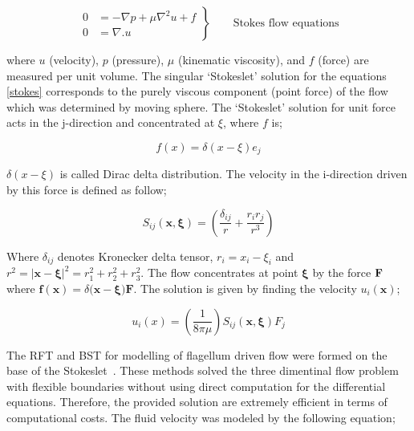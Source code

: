 \documentclass[12pt,a4paper,titlepage]{report}
\begin{document}
\begin{equation}
 \left.\begin{aligned}
        0 &= - \nabla p + \mu \nabla ^ 2 u + f \\
        0 &=\nabla . u
       \end{aligned}
 \right\}
 \qquad \text{Stokes flow equations}
\label{stokes}
\end{equation}

where $u$ (velocity), $p$ (pressure), $\mu $ (kinematic viscosity), and $f$ (force) are measured per unit
volume. The singular \lq{}Stokeslet\rq{} solution for the equations \ref{stokes} corresponds to the purely 
viscous component (point force) of the flow which was determined by moving sphere. 
The \lq{}Stokeslet\rq{} solution for unit force acts in the j-direction and concentrated at $\xi $, where $f$ is;
  

\begin{equation}
 f (x) = \delta (x - \xi) e_j 
\label{force}
\end{equation}

$\delta (x - \xi)$ is called Dirac delta distribution. The velocity in the i-direction driven by this force is defined
 as follow;


\begin{equation}
 S _{ij} \bm{(x , \xi)} = (\frac{\delta _{ij}}{r} + \frac{r_i r_j}{r^3})
\label{i-direction}
\end{equation}

Where $\delta _{ij}$ denotes Kronecker delta tensor, $r_i = x_i - \xi _i$ and $r^2 =| \bm{x}- \bm{\xi} |^2 = r_1 ^2 + r_2 ^ 2 + r_3 ^2$.
The flow concentrates at point $\bm \xi$ by the force $\bold F$ where $ \bm{f (x)} = \delta (\bm{x} - \bm{\xi) F}$.
The solution is given by finding the velocity $u_i(\bm x)$;

\begin{equation}
 u_i(x) =(\frac{1}{8 \pi \mu}) S_{ij}\bm{( x, \xi)} F_j
\label{velocity}
\end{equation}

The \ac*{RFT} and  \ac*{BST} for modelling of flagellum driven 
flow were formed on the base of the Stokeslet~\citep{smith2009boundary}. These methods solved the 
three dimentinal flow problem with flexible boundaries without using direct computation for the differential
equations. Therefore, the provided solution are extremely efficient in terms of computational costs. The fluid
velocity was modeled by the following equation;
   
\end{document}
